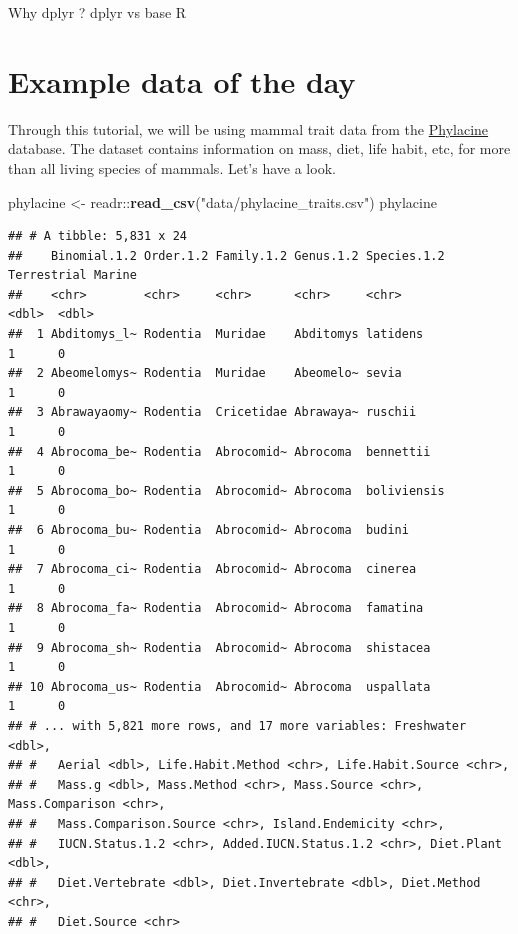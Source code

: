 \documentclass[]{book}
\newenvironment{Shaded}{}{}
\newcommand{\KeywordTok}[1]{\textcolor[rgb]{0.00,0.44,0.13}{\textbf{#1}}}
\newcommand{\NormalTok}[1]{#1}
\newcommand{\OperatorTok}[1]{\textcolor[rgb]{0.40,0.40,0.40}{#1}}
\newcommand{\StringTok}[1]{\textcolor[rgb]{0.25,0.44,0.63}{#1}}
\begin{document}
Why dplyr ? dplyr vs base R

\hypertarget{example-data-of-the-day}{%
\section{Example data of the day}\label{example-data-of-the-day}}

Through this tutorial, we will be using mammal trait data from the \href{https://megapast2future.github.io/PHYLACINE_1.2/}{Phylacine} database. The dataset contains information on mass, diet, life habit, etc, for more than all living species of mammals. Let's have a look.

\begin{Shaded}
\begin{Highlighting}[]
\NormalTok{phylacine <-}\StringTok{ }\NormalTok{readr}\OperatorTok{::}\KeywordTok{read_csv}\NormalTok{(}\StringTok{"data/phylacine_traits.csv"}\NormalTok{)}
\NormalTok{phylacine}
\end{Highlighting}
\end{Shaded}

\begin{verbatim}
## # A tibble: 5,831 x 24
##    Binomial.1.2 Order.1.2 Family.1.2 Genus.1.2 Species.1.2 Terrestrial Marine
##    <chr>        <chr>     <chr>      <chr>     <chr>             <dbl>  <dbl>
##  1 Abditomys_l~ Rodentia  Muridae    Abditomys latidens              1      0
##  2 Abeomelomys~ Rodentia  Muridae    Abeomelo~ sevia                 1      0
##  3 Abrawayaomy~ Rodentia  Cricetidae Abrawaya~ ruschii               1      0
##  4 Abrocoma_be~ Rodentia  Abrocomid~ Abrocoma  bennettii             1      0
##  5 Abrocoma_bo~ Rodentia  Abrocomid~ Abrocoma  boliviensis           1      0
##  6 Abrocoma_bu~ Rodentia  Abrocomid~ Abrocoma  budini                1      0
##  7 Abrocoma_ci~ Rodentia  Abrocomid~ Abrocoma  cinerea               1      0
##  8 Abrocoma_fa~ Rodentia  Abrocomid~ Abrocoma  famatina              1      0
##  9 Abrocoma_sh~ Rodentia  Abrocomid~ Abrocoma  shistacea             1      0
## 10 Abrocoma_us~ Rodentia  Abrocomid~ Abrocoma  uspallata             1      0
## # ... with 5,821 more rows, and 17 more variables: Freshwater <dbl>,
## #   Aerial <dbl>, Life.Habit.Method <chr>, Life.Habit.Source <chr>,
## #   Mass.g <dbl>, Mass.Method <chr>, Mass.Source <chr>, Mass.Comparison <chr>,
## #   Mass.Comparison.Source <chr>, Island.Endemicity <chr>,
## #   IUCN.Status.1.2 <chr>, Added.IUCN.Status.1.2 <chr>, Diet.Plant <dbl>,
## #   Diet.Vertebrate <dbl>, Diet.Invertebrate <dbl>, Diet.Method <chr>,
## #   Diet.Source <chr>
\end{verbatim}
\end{document}
